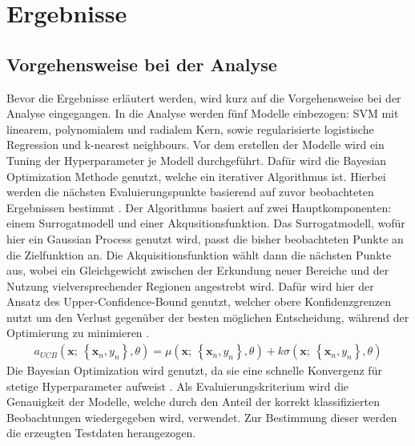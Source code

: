 \documentclass[
]{article}
\begin{document}
\section{Ergebnisse}

\subsection{Vorgehensweise bei der Analyse}

Bevor die Ergebnisse erläutert werden, wird kurz auf die Vorgehensweise
bei der Analyse eingegangen. In die Analyse werden fünf Modelle
einbezogen: SVM mit linearem, polynomialem und radialem Kern, sowie
regularisierte logistische Regression und k-nearest neighbours.\newline
Vor dem erstellen der Modelle wird ein Tuning der Hyperparameter je
Modell durchgeführt. Dafür wird die Bayesian Optimization Methode
genutzt, welche ein iterativer Algorithmus ist. Hierbei werden die
nächsten Evaluierungspunkte basierend auf zuvor beobachteten Ergebnissen
bestimmt \parencite{yangHyperparameterOptimizationMachine2020}. Der
Algorithmus basiert auf zwei Hauptkomponenten: einem Surrogatmodell und
einer Akqusitionsfunktion. Das Surrogatmodell, wofür hier ein Gaussian
Process genutzt wird, passt die bisher beobachteten Punkte an die
Zielfunktion an. Die Akquisitionsfunktion wählt dann die nächsten Punkte
aus, wobei ein Gleichgewicht zwischen der Erkundung neuer Bereiche und
der Nutzung vielversprechender Regionen angestrebt wird. Dafür wird hier
der Ansatz des Upper-Confidence-Bound genutzt, welcher obere
Konfidenzgrenzen nutzt um den Verlust gegenüber der besten möglichen
Entscheidung, während der Optimierung zu minimieren
\parencite{snoekPracticalBayesianOptimization2012}. \begin{align}
a_{UCB}(\mathbf{x};~\left\{\mathbf{x}_n,y_n\right\},\theta) = \mu(\mathbf{x};~\left\{\mathbf{x}_n,y_n\right\},\theta) + k \sigma(\mathbf{x};~\left\{\mathbf{x}_n,y_n\right\},\theta)
\end{align} Die Bayesian Optimization wird genutzt, da sie eine schnelle
Konvergenz für stetige Hyperparameter aufweist
\parencite{yangHyperparameterOptimizationMachine2020}. Als
Evaluierungskriterium wird die Genauigkeit der Modelle, welche durch den
Anteil der korrekt klassifizierten Beobachtungen wiedergegeben wird,
verwendet. Zur Bestimmung dieser werden die erzeugten Testdaten
herangezogen.
\end{document}
